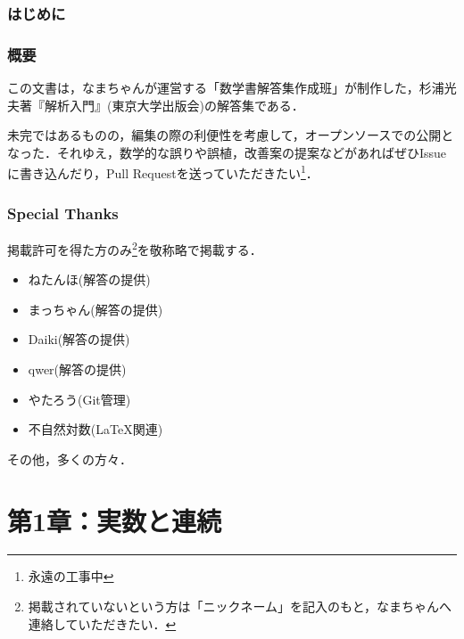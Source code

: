 \documentclass[a4paper,10pt,fleqn]{ltjsarticle}
\begin{document}


\thispagestyle{empty}

\newpage
{}
\pagecolor{white}

\begin{multicols}{3}
    \tableofcontents
\end{multicols}

\newpage

\section*{はじめに}


\section*{概要}

この文書は，なまちゃんが運営する「数学書解答集作成班」が制作した，杉浦光夫著『解析入門』(東京大学出版会)の解答集である．

未完ではあるものの，編集の際の利便性を考慮して，オープンソースでの公開となった．それゆえ，数学的な誤りや誤植，改善案の提案などがあればぜひIssueに書き込んだり，Pull Requestを送っていただきたい\footnote{永遠の工事中}．


\section*{Special Thanks}

掲載許可を得た方のみ\footnote{掲載されていないという方は「ニックネーム」を記入のもと，なまちゃんへ連絡していただきたい．}を敬称略で掲載する．
\begin{itemize}
    \item ねたんほ(解答の提供)
    \item まっちゃん(解答の提供)
    \item Daiki(解答の提供)
    \item qwer(解答の提供)
    \item やたろう(Git管理)
    \item 不自然対数(\LaTeX 関連)
\end{itemize}

その他，多くの方々．

\newpage
\part*{第1章：実数と連続}
\end{document}

